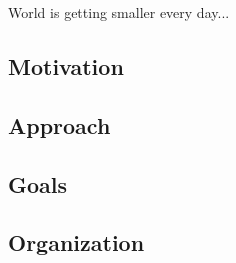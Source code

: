 World is getting smaller every day...

\subsection{Motivation}
	
\subsection{Approach}
	
\subsection{Goals}
	
\subsection{Organization}
